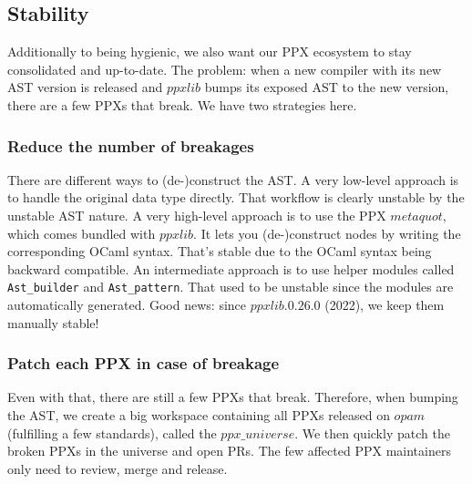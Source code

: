 \documentclass[10pt, a4paper, twocolumn]{article}
\begin{document}
\subsection{Stability}\label{stability}

Additionally to being hygienic, we also want our PPX ecosystem to stay
consolidated and up-to-date. The problem: when a new compiler with its new AST
version is released and $ppxlib$ bumps its exposed AST to the new version, there
are a few PPXs that break. We have two strategies here.

\subsubsection*{Reduce the number of breakages}

There are different ways to (de-)construct the AST. A very low-level approach is
to handle the original data type directly. That workflow is clearly unstable by
the unstable AST nature. A very high-level approach is to use the PPX
$metaquot$, which comes bundled with $ppxlib$. It lets you (de-)construct nodes
by writing the corresponding OCaml syntax. That's stable due to the OCaml syntax
being backward compatible. An intermediate approach is to use helper modules
called \texttt{Ast\_builder} and \texttt{Ast\_pattern}. That used to be unstable
since the modules are automatically generated. Good news: since $ppxlib.0.26.0$
(2022), we keep them manually stable!

%
%

\subsubsection*{Patch each PPX in case of breakage}

Even with that, there are still a few PPXs that break. Therefore, when bumping
the AST, we create a big workspace containing all PPXs released on $opam$
(fulfilling a few standards), called the $ppx\_universe$\cite{universe}. We then
quickly patch the broken PPXs in the universe and open PRs. The few affected PPX
maintainers only need to review, merge and release.


\nocite{*}


\end{document}
